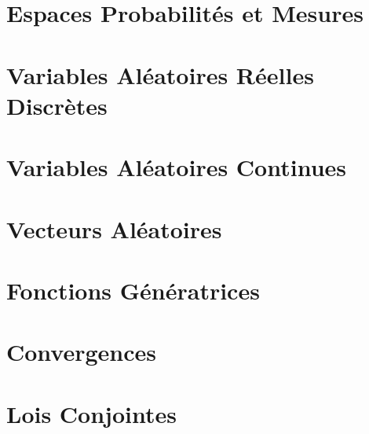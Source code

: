 



\chapter{Espaces Probabilités et Mesures}


\chapter{Variables Aléatoires Réelles Discrètes}


\chapter{Variables Aléatoires Continues}


\chapter{Vecteurs Aléatoires}


\chapter{Fonctions Génératrices}


\chapter{Convergences}


\chapter{Lois Conjointes}


